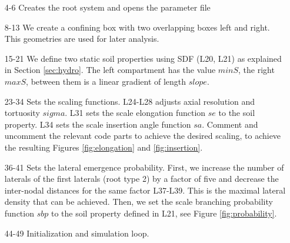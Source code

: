 \documentclass[a4paper]{article}
\begin{document}
\begin{itemize}

\item[4-6] Creates the root system and opens the parameter file

\item[8-13] We create a confining box with two overlapping boxes left and right. This geometries are used for later analysis.

\item[15-21] We define two static soil properties using SDF (L20, L21) as explained in Section \ref{sec:hydro}. 
The left compartment has the value $minS$, the right $maxS$, between them is a linear gradient of length $slope$.

\item[23-34] Sets the scaling functions. L24-L28 adjusts axial resolution and tortuosity $sigma$. L31 sets the scale elongation function $se$ to the soil property. L34 sets the scale insertion angle function $sa$. 
Comment and uncomment the relevant code parts to achieve the desired scaling, to achieve the resulting Figures \ref{fig:elongation} and \ref{fig:insertion}.

\item[36-41] Sets the lateral emergence probability. 
First, we increase the number of laterals of the first laterals (root type 2) by a factor of five and decrease the inter-nodal distances for the same factor L37-L39. This is the maximal lateral density that can be achieved.
Then, we set the scale branching probability function $sbp$ to the soil property defined in L21, see Figure \ref{fig:probability}.

\item[44-49] Initialization and simulation loop.

\end{itemize}
\end{document}
